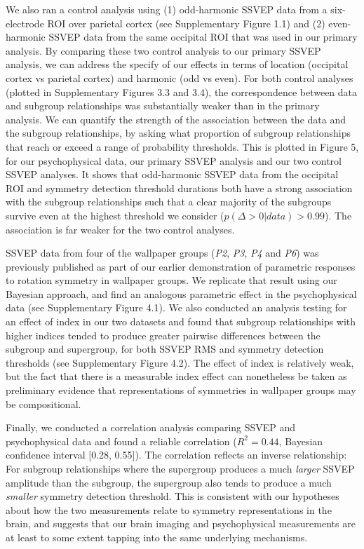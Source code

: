 \documentclass[11pt, twoside]{article}
\begin{document}
We also ran a control analysis using (1) odd-harmonic SSVEP data from a six-electrode ROI over parietal cortex (see Supplementary Figure 1.1) and (2) even-harmonic SSVEP data from the same occipital ROI that was used in our primary analysis. By comparing these two control analysis to our primary SSVEP analysis, we can address the specify of our effects in terms of location (occipital cortex vs parietal cortex) and harmonic (odd vs even). For both control analyses (plotted in Supplementary Figures 3.3 and 3.4), the correspondence between data and subgroup relationships was substantially weaker than in the primary analysis. We can quantify the strength of the association between the data and the subgroup relationships, by asking what proportion of subgroup relationships that reach or exceed a range of probability thresholds. This is plotted in Figure 5, for our psychophysical data, our primary SSVEP analysis and our two control SSVEP analyses. It shows that odd-harmonic SSVEP data from the occipital ROI and symmetry detection threshold durations both have a strong association with the subgroup relationships such that a clear majority of the subgroups survive even at the highest threshold we consider ($p(\Delta>0|data)>0.99$). The association is far weaker for the two control analyses.

SSVEP data from four of the wallpaper groups (\textit{P2}, \textit{P3}, \textit{P4} and \textit{P6}) was previously published as part of our earlier demonstration of parametric responses to rotation symmetry in wallpaper groups\citep{RN1725}. We replicate that result using our Bayesian approach, and find an analogous parametric effect in the psychophysical data (see Supplementary Figure 4.1). We also conducted an analysis testing for an effect of index in our two datasets and found that subgroup relationships with higher indices tended to produce greater pairwise differences between the subgroup and supergroup, for both SSVEP RMS and symmetry detection thresholds (see Supplementary Figure 4.2). The effect of index is relatively weak, but the fact that there is a measurable index effect can nonetheless be taken as preliminary evidence that representations of symmetries in wallpaper groups may be compositional.

Finally, we conducted a correlation analysis comparing SSVEP and psychophysical data and found a reliable correlation ($R^2 = 0.44$, Bayesian confidence interval [0.28, 0.55]). The correlation reflects an inverse relationship: For subgroup relationships where the supergroup produces a much \textit{larger} SSVEP amplitude than the subgroup, the supergroup also tends to produce a much \textit{smaller} symmetry detection threshold. This is consistent with our hypotheses about how the two measurements relate to symmetry representations in the brain, and suggests that our brain imaging and psychophysical measurements are at least to some extent tapping into the same underlying mechanisms.
\end{document}
